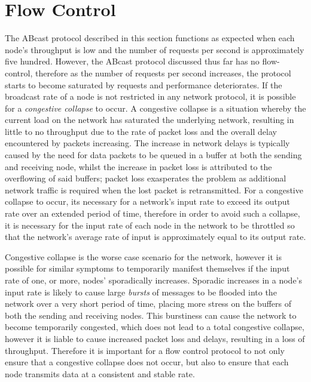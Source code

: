 \section{Flow Control}
The \textsf{ABcast} protocol described in this section functions as expected when each node's throughput is low and the number of requests per second is approximately five hundred.  However, the \textsf{ABcast} protocol discussed thus far has no flow-control, therefore as the number of requests per second increases, the protocol starts to become saturated by requests and performance deteriorates.  If the broadcast rate of a node is not restricted in any network protocol, it is possible for a \emph{congestive collapse} \citep{CongestiveCollapse, Jacobson:1988:CAC:52324.52356} to occur.  A congestive collapse is a situation whereby the current load on the network has saturated the underlying network, resulting in little to no throughput due to the rate of packet loss and the overall delay encountered by packets increasing.  The increase in network delays is typically caused by the need for data packets to be queued in a buffer at both the sending and receiving node, whilst the increase in packet loss is attributed to the overflowing of said buffers; packet loss exasperates the problem as additional network traffic is required when the lost packet is retransmitted.  For a congestive collapse to occur, its necessary for a network's input rate to exceed its output rate over an extended period of time, therefore in order to avoid such a collapse, it is necessary for the input rate of each node in the network to be throttled so that the network's average rate of input is approximately equal to its output rate.  

Congestive collapse is the worse case scenario for the network, however it is possible for similar symptoms to temporarily manifest themselves if the input rate of one, or more, nodes' sporadically increases.  Sporadic increases in a node's input rate is likely to cause large \emph{bursts} of messages to be flooded into the network over a very short period of time, placing more stress on the buffers of both the sending and receiving nodes.  This burstiness can cause the network to become temporarily congested, which does not lead to a total congestive collapse, however it is liable to cause increased packet loss and delays, resulting in a loss of throughput.  Therefore it is important for a flow control protocol to not only ensure that a congestive collapse does not occur, but also to ensure that each node transmits data at a consistent and stable rate.  

